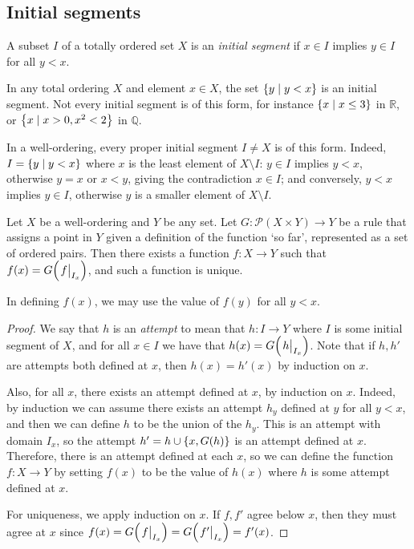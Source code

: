 \subsection{Initial segments}
\begin{definition}
    A subset \( I \) of a totally ordered set \( X \) is an \emph{initial segment} if \( x \in I \) implies \( y \in I \) for all \( y < x \).
\end{definition}
\begin{example}
    In any total ordering \( X \) and element \( x \in X \), the set \( \qty{y \mid y < x} \) is an initial segment.
    Not every initial segment is of this form, for instance \( \qty{x \mid x \leq 3} \) in \( \mathbb R \), or \( \qty{x \mid x > 0, x^2 < 2} \) in \( \mathbb Q \).

    In a well-ordering, every proper initial segment \( I \neq X \) is of this form.
    Indeed, \( I = \qty{y \mid y < x} \) where \( x \) is the least element of \( X \setminus I \): \( y \in I \) implies \( y < x \), otherwise \( y = x \) or \( x < y \), giving the contradiction \( x \in I \); and conversely, \( y < x \) implies \( y \in I \), otherwise \( y \) is a smaller element of \( X \setminus I \).
\end{example}
\begin{theorem}
    Let \( X \) be a well-ordering and \( Y \) be any set.
    Let \( G \colon \mathcal P(X \times Y) \to Y \) be a rule that assigns a point in \( Y \) given a definition of the function `so far', represented as a set of ordered pairs.
    Then there exists a function \( f \colon X \to Y \) such that \( f(x) = G\qty(\eval{f}_{I_x}) \), and such a function is unique.
\end{theorem}
\begin{remark}
    In defining \( f(x) \), we may use the value of \( f(y) \) for all \( y < x \).
\end{remark}
\begin{proof}
    We say that \( h \) is an \emph{attempt} to mean that \( h \colon I \to Y \) where \( I \) is some initial segment of \( X \), and for all \( x \in I \) we have that \( h(x) = G\qty(\eval{h}_{I_x}) \).
    Note that if \( h, h' \) are attempts both defined at \( x \), then \( h(x) = h'(x) \) by induction on \( x \).

    Also, for all \( x \), there exists an attempt defined at \( x \), by induction on \( x \).
    Indeed, by induction we can assume there exists an attempt \( h_y \) defined at \( y \) for all \( y < x \), and then we can define \( h \) to be the union of the \( h_y \).
    This is an attempt with domain \( I_x \), so the attempt \( h' = h \cup \qty{x, G(h)} \) is an attempt defined at \( x \).
    Therefore, there is an attempt defined at each \( x \), so we can define the function \( f \colon X \to Y \) by setting \( f(x) \) to be the value of \( h(x) \) where \( h \) is some attempt defined at \( x \).

    For uniqueness, we apply induction on \( x \).
    If \( f, f' \) agree below \( x \), then they must agree at \( x \) since \( f(x) = G\qty(\eval{f}_{I_x}) = G\qty(\eval{f'}_{I_x}) = f'(x) \).
\end{proof}
